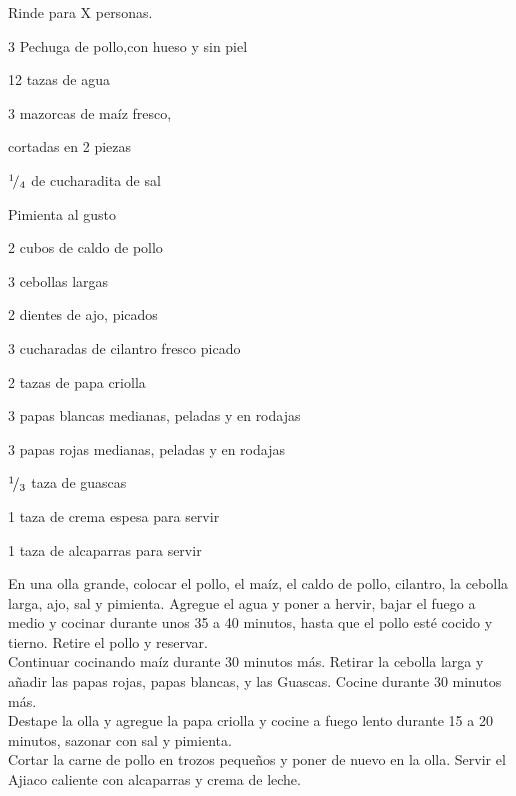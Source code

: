 
Rinde para X personas.

\begin{ingredientes}
\item 3 Pechuga de pollo,con hueso y sin piel
\item 12 tazas de agua
\item 3 mazorcas de maíz fresco, 
\item cortadas en 2 piezas
\item ${}^{1}\!/_{4}$ de cucharadita de sal
\item Pimienta al gusto
\item 2 cubos de caldo de pollo
\item 3 cebollas largas
\item 2 dientes de ajo, picados
\item 3 cucharadas de cilantro fresco picado
\item 2 tazas de papa criolla
\item 3 papas blancas medianas, peladas y en rodajas
\item 3 papas rojas medianas, peladas y en rodajas
\item ${}^{1}\!/_{3}$ taza de guascas
\item 1 taza de crema espesa para servir
\item 1 taza de alcaparras para servir
\end{ingredientes}
\preparacion

En una olla grande, colocar el pollo, el maíz, el caldo de pollo, cilantro, la cebolla larga, ajo, sal y pimienta. Agregue el agua y poner a hervir, bajar el fuego a medio y cocinar durante unos 35 a 40 minutos, hasta que el pollo esté cocido y tierno. Retire el pollo y reservar.\\

Continuar cocinando maíz durante 30 minutos más. Retirar la cebolla larga y añadir las papas rojas, papas blancas, y las Guascas. Cocine durante 30 minutos más.\\

Destape la olla y agregue la papa criolla y cocine a fuego lento durante 15 a 20 minutos, sazonar con sal y pimienta.\\

Cortar la carne de pollo en trozos pequeños y poner de nuevo en la olla. Servir el Ajiaco caliente con alcaparras y crema de leche.